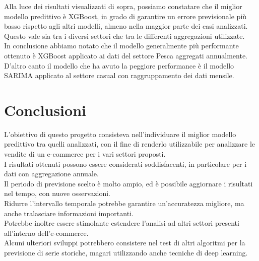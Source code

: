 \documentclass[12pt, a4paper, twocolumn]{article} %
\begin{document}
Alla luce dei risultati visualizzati di sopra, possiamo constatare che il miglior modello predittivo è XGBoost, in grado di garantire un errore previsionale più basso rispetto agli altri modelli, almeno nella maggior parte dei casi analizzati.\\
Questo vale sia tra i diversi settori che tra le differenti aggregazioni utilizzate.\\
In conclusione abbiamo notato che il modello generalmente più performante ottenuto è XGBoost applicato ai dati del settore Pesca aggregati annualmente.\\
D'altro canto il modello che ha avuto la peggiore performance è il modello SARIMA applicato al settore casual con raggruppamento dei dati mensile.

\section{Conclusioni}
L'obiettivo di questo progetto consisteva nell'individuare il miglior modello predittivo tra quelli analizzati, con il fine di renderlo utilizzabile per analizzare le vendite di un e-commerce per i vari settori proposti.\\
I risultati ottenuti possono essere considerati soddisfacenti, in particolare per i dati con aggregazione annuale.\\
Il periodo di previsione scelto è molto ampio, ed è possibile aggiornare i risultati nel tempo, con nuove osservazioni.\\
Ridurre l'intervallo temporale potrebbe garantire un'accuratezza migliore, ma anche tralasciare informazioni importanti.\\
Potrebbe inoltre essere stimolante estendere l'analisi ad altri settori presenti all'interno dell'e-commerce.\\
Alcuni ulteriori sviluppi potrebbero consistere nel test di altri algoritmi per la previsione di serie storiche, magari utilizzando anche tecniche di deep learning.

\nocite{*} %
\printbibliography[title={Bibliografia}] %
\end{document}
